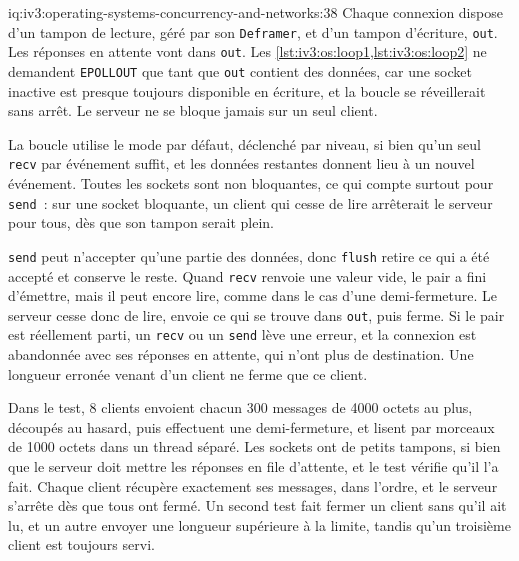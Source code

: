 \begin{solution}{iq:iv3:operating-systems-concurrency-and-networks:38}
Chaque connexion dispose d'un tampon de lecture, géré par son \texttt{Deframer}, et d'un tampon d'écriture, \texttt{out}. Les réponses en attente vont dans \texttt{out}. Les \cref{lst:iv3:os:loop1,lst:iv3:os:loop2} ne demandent \texttt{EPOLLOUT} que tant que \texttt{out} contient des données, car une socket inactive est presque toujours disponible en écriture, et la boucle se réveillerait sans arrêt. Le serveur ne se bloque jamais sur un seul client.
\label{lst:iv3:os:loop1}
\enlargethispage{-2\baselineskip}%
\label{lst:iv3:os:loop2}

La boucle utilise le mode par défaut, déclenché par niveau, si bien qu'un seul \texttt{recv} par événement suffit, et les données restantes donnent lieu à un nouvel événement. Toutes les sockets sont non bloquantes, ce qui compte surtout pour \texttt{send}~: sur une socket bloquante, un client qui cesse de lire arrêterait le serveur pour tous, dès que son tampon serait plein.

\texttt{send} peut n'accepter qu'une partie des données, donc \texttt{flush} retire ce qui a été accepté et conserve le reste. Quand \texttt{recv} renvoie une valeur vide, le pair a fini d'émettre, mais il peut encore lire, comme dans le cas d'une demi-fermeture. Le serveur cesse donc de lire, envoie ce qui se trouve dans \texttt{out}, puis ferme. Si le pair est réellement parti, un \texttt{recv} ou un \texttt{send} lève une erreur, et la connexion est abandonnée avec ses réponses en attente, qui n'ont plus de destination. Une longueur erronée venant d'un client ne ferme que ce client.

Dans le test, 8 clients envoient chacun 300 messages de 4000 octets au plus, découpés au hasard, puis effectuent une demi-fermeture, et lisent par morceaux de 1000 octets dans un thread séparé. Les sockets ont de petits tampons, si bien que le serveur doit mettre les réponses en file d'attente, et le test vérifie qu'il l'a fait. Chaque client récupère exactement ses messages, dans l'ordre, et le serveur s'arrête dès que tous ont fermé. Un second test fait fermer un client sans qu'il ait lu, et un autre envoyer une longueur supérieure à la limite, tandis qu'un troisième client est toujours servi.


\end{solution}

